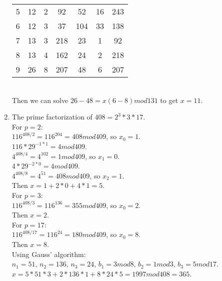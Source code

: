 \documentclass{assignment}
\begin{document}
\begin{problemlist}
\begin{answer}
\begin{enumerate}
\begin{tabular}{c||c|c|c||c|c|c}
      5 & 12 & 2 & 92  & 52  & 16 & 243\\
      6 & 12 & 3 & 37  & 104 & 33 & 138\\
      7 & 13 & 3 & 218 & 23  & 1  & 92\\
      8 & 13 & 4 & 162 & 24  & 2  & 218\\
      9 & 26 & 8 & 207 & 48  & 6  & 207\\
    \end{tabular}
    \\Then we can solve $26-48=x(6-8) mod 131$ to get $x=11$.\\
\clearpage
  \item
    The prime factorization of $408=2^3*3*17$.\\
    For $p=2$:\\
    $116^{408/2}=116^{204}=408 mod 409$, so $x_0=1$.\\
    $116*29^{-1*1}=4 mod 409$.\\
    $4^{408/4}=4^{102}=1 mod 409$, so $x_1 = 0$.\\
    $4*29^{-2*0} = 4 mod 409$.\\
    $4^{408/8}=4^{51}=408 mod 409$, so $x_2 = 1$.\\
    Then $x=1 + 2*0 + 4*1 = 5$.\\
    For $p=3$:\\
    $116^{408/3}=116^{136}=355 mod 409$, so $x_0 = 2$.\\
    Then $x=2$.\\
    For $p=17$:\\
    $116^{408/17}=116^{24}=180 mod 409$, so $x_0 = 8$.\\
    Then $x=8$.\\
    Using Gauss' algorithm:\\
    $n_1 = 51$, $n_2 = 136$, $n_3 = 24$, $b_1 = 3 mod 8$, $b_2 = 1 mod 3$, $b_3 = 5 mod 17$.\\
    $x=5*51*3+2*136*1+8*24*5=1997 mod 408=365$.\\
  \end{enumerate}
\end{answer}


\end{problemlist}
\end{document}
